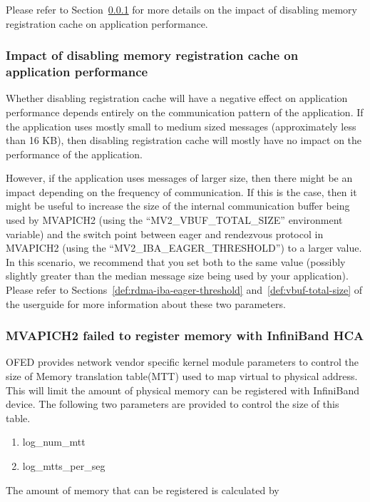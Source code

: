 Please refer to Section~\ref{sec:impact-disable-dereg} for more details on
the impact of disabling memory registration cache on application
performance.

\subsubsection{Impact of disabling memory registration cache on application
performance}
\label{sec:impact-disable-dereg}

Whether disabling registration cache will have a negative effect on
application performance depends entirely on the communication pattern of
the application. If the application uses mostly small to medium sized
messages (approximately less than 16 KB), then disabling registration
cache will mostly have no impact on the performance of the application.

However, if the application uses messages of larger size, then there might
be an impact depending on the frequency of communication. If this is the
case, then it might be useful to increase the size of the internal
communication buffer being used by MVAPICH2 (using the
``MV2\_VBUF\_TOTAL\_SIZE'' environment variable) and the switch point
between eager and rendezvous protocol in MVAPICH2 (using the
``MV2\_IBA\_EAGER\_THRESHOLD'') to a larger value. In this scenario, we
recommend that you set both to the same value (possibly slightly greater
than the median message size being used by your application). Please refer
to Sections~\ref{def:rdma-iba-eager-threshold}
and~\ref{def:vbuf-total-size} of the userguide for more information about
these two parameters.

\subsubsection{MVAPICH2 failed to register memory with InfiniBand HCA}

OFED provides network vendor specific kernel module parameters to control
the size of Memory translation table(MTT) used to map virtual to physical
address. This will limit the amount of physical memory can be registered
with InfiniBand device. The following two parameters are provided to control
the size of this table.
\begin{enumerate}
  \item log\_num\_mtt
  \item log\_mtts\_per\_seg
\end{enumerate}

The amount of memory that can be registered is calculated by 

